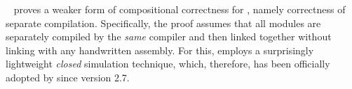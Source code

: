 {\myparagraph{\scc{}}
%
\scc{}~\cite{kang:scc} proves a weaker form of compositional correctness for \cc{},
namely correctness of separate compilation.
Specifically, the proof assumes that all modules
are separately compiled by the \emph{same} compiler and then linked
together without linking with any handwritten assembly.
For this, \scc{} employs a surprisingly lightweight \emph{closed} simulation technique,
which, therefore, has been officially adopted by \cc{} since version 2.7.





%






}
